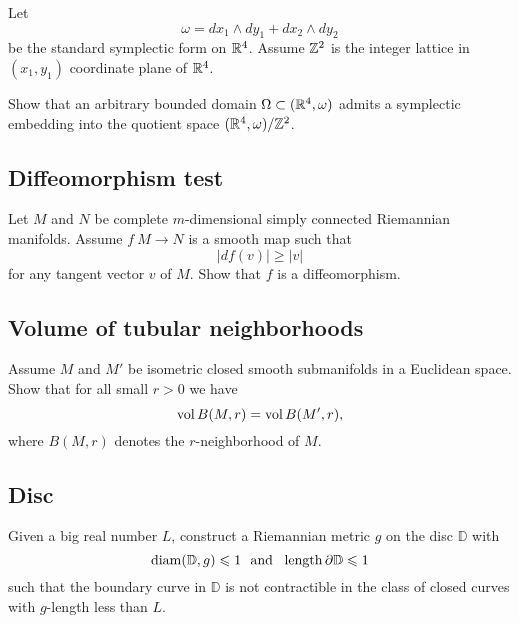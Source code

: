 \begin{pr}
Let 
\[\omega=dx_1\wedge dy_1+ dx_2\wedge dy_2\]
be the standard symplectic form on $\mathbb{R}^4$.
Assume $\mathbb{Z}^2$ is the integer lattice in $(x_1,y_1)$ coordinate plane of $\mathbb{R}^4$.

Show that an arbitrary bounded domain $\Omega\subset (\mathbb{R}^4,\omega)$
admits a symplectic embedding into the quotient space $(\mathbb{R}^4,\omega)/\mathbb{Z}^2$. 
\end{pr}

\subsection*{Diffeomorphism test\easy}
\label{Diffeomorphism test}


\begin{pr}
Let $M$ and $N$ be 
complete 
$m$-dimensional
simply connected 
Riemannian manifolds.
Assume $f\:M\to N$
is a smooth map such that 
$$|df(v)|\ge |v|$$
for any tangent vector $v$ of $M$.
Show that $f$ is a diffeomorphism.
\end{pr}

\subsection*{Volume of tubular neighborhoods\thm}
\label{Volume of tubular neighborhoods}

\begin{pr}
Assume $M$ and $M'$ be isometric closed smooth submanifolds in a Euclidean space.
Show that for all small $r>0$ we have
$$\operatorname{\rm vol}\nolimits B(M,r)=\operatorname{\rm vol}\nolimits B(M',r),$$
where $B(M,r)$ denotes the $r$-neighborhood of $M$.
\end{pr}

\subsection*{Disc\hard}
\label{Disc}

\begin{pr}
Given a big real number $L$,
construct a Riemannian metric $g$ on the disc $\mathbb D$ 
with 
\[\diam(\mathbb D,g)\le 1
\ \ 
\text{and}
\ \ 
\length \partial\mathbb D\le 1  \]
such that the boundary curve in $\mathbb D$ is not contractible in the class of closed curves with $g$-length less than $L$.
\end{pr}

